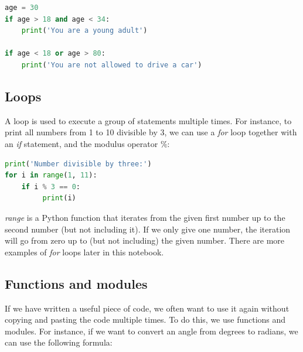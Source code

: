 \documentclass[a4paper , 12pt]{book}
\begin{document}
\begin{center}
\begin{lstlisting}[language=Python, frame=single]
age = 30
if age > 18 and age < 34:
    print('You are a young adult')

if age < 18 or age > 80:
    print('You are not allowed to drive a car')
\end{lstlisting}
\end{center}

\subsection{Loops}

A loop is used to execute a group of statements multiple times. For instance, to print all numbers from 1 to 10 divisible by 3, we can use a \textit{for} loop together with an \textit{if} statement, and the modulus operator $\%$:

\begin{center}
\begin {lstlisting}[language=Python, frame=single]
print('Number divisible by three:')
for i in range(1, 11):
    if i %
         print(i)
\end{lstlisting}
\end{center}

\textit{range} is a Python function that iterates from the given first number up to the second number (but not including it). If we only give one number, the iteration will go from zero up to (but not including) the given number. There are more examples of \textit{for} loops later in this notebook.

\subsection{Functions and modules}

If we have written a useful piece of code, we often want to use it again without copying and pasting the code multiple times. To do this, we use functions and modules. For instance, if we want to convert an angle from degrees to radians, we can use the following formula: 
\end{document}

